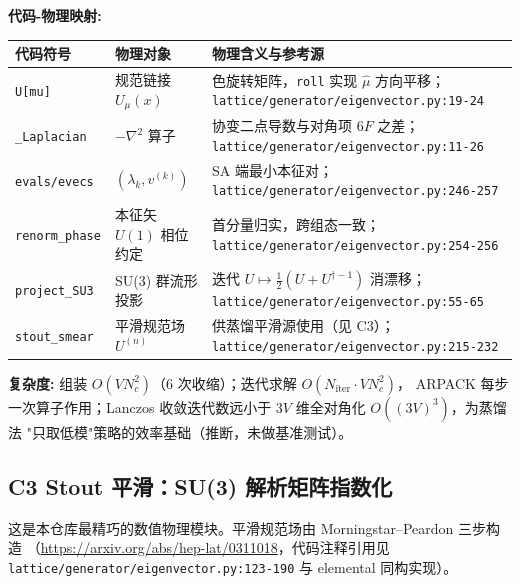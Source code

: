 \documentclass[UTF8]{ctexart}
\begin{document}
\begin{mapbox}
\textbf{代码-物理映射:}
\end{mapbox}
\begin{xltabular}{\textwidth}{llX}
\toprule
\textcolor{map}{代码符号} & 物理对象 & 物理含义与参考源 \\
\midrule
\endhead
\texttt{U[mu]} & 规范链接 $U_\mu(x)$ & 色旋转矩阵，\texttt{roll} 实现 $\hat\mu$ 方向平移；
  \texttt{\nolinkurl{lattice/generator/eigenvector.py:19-24}} \\
\texttt{\_Laplacian} & $-\nabla^2$ 算子 & 协变二点导数与对角项 $6F$ 之差；
  \texttt{\nolinkurl{lattice/generator/eigenvector.py:11-26}} \\
\texttt{evals/evecs} & $(\lambda_k, v^{(k)})$ & SA 端最小本征对；
  \texttt{\nolinkurl{lattice/generator/eigenvector.py:246-257}} \\
\texttt{renorm\_phase} & 本征矢 $U(1)$ 相位约定 & 首分量归实，跨组态一致；
  \texttt{\nolinkurl{lattice/generator/eigenvector.py:254-256}} \\
\texttt{project\_SU3} & SU(3) 群流形投影 & 迭代 $U\mapsto\tfrac12(U+U^{\dagger-1})$ 消漂移；
  \texttt{\nolinkurl{lattice/generator/eigenvector.py:55-65}} \\
\texttt{stout\_smear} & 平滑规范场 $U^{(n)}$ & 供蒸馏平滑源使用（见 C3）；
  \texttt{\nolinkurl{lattice/generator/eigenvector.py:215-232}} \\
\bottomrule
\end{xltabular}

\textbf{复杂度:} 组装 $O(V N_c^2)$（6 次收缩）；迭代求解 $O(N_{\text{iter}} \cdot V N_c^2)$，
ARPACK 每步一次算子作用；Lanczos 收敛迭代数远小于 $3V$ 维全对角化 $O((3V)^3)$，为蒸馏法
"只取低模"策略的效率基础（推断，未做基准测试）。

\subsection{C3 Stout 平滑：SU(3) 解析矩阵指数化}
\label{sec:c3}

这是本仓库最精巧的数值物理模块。平滑规范场由 Morningstar--Peardon 三步构造
（\url{https://arxiv.org/abs/hep-lat/0311018}，代码注释引用见
\texttt{lattice/generator/eigenvector.py:123-190} 与 elemental 同构实现）。
\end{document}
